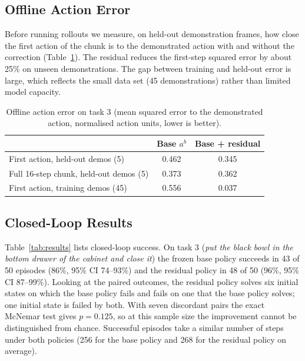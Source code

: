 \documentclass[conference]{IEEEtran}
\begin{document}
\subsection{Offline Action Error}
Before running rollouts we measure, on held-out demonstration frames, how close the first action of the chunk is to the demonstrated action with and without the correction (Table~\ref{tab:offline}). The residual reduces the first-step squared error by about 25\% on unseen demonstrations. The gap between training and held-out error is large, which reflects the small data set (45 demonstrations) rather than limited model capacity.

\begin{table}[t]
\centering
\caption{Offline action error on task 3 (mean squared error to the demonstrated action, normalised action units, lower is better).}
\label{tab:offline}
\begin{tabular}{lcc}
\toprule
 & Base $a^{b}$ & Base + residual \\
\midrule
First action, held-out demos (5) & 0.462 & 0.345 \\
Full 16-step chunk, held-out demos (5) & 0.373 & 0.362 \\
First action, training demos (45) & 0.556 & 0.037 \\
\bottomrule
\end{tabular}
\end{table}

\subsection{Closed-Loop Results}
Table~\ref{tab:results} lists closed-loop success. On task 3 (\emph{put the black bowl in the bottom drawer of the cabinet and close it}) the frozen base policy succeeds in 43 of 50 episodes (86\%, 95\% CI 74--93\%) and the residual policy in 48 of 50 (96\%, 95\% CI 87--99\%). Looking at the paired outcomes, the residual policy solves six initial states on which the base policy fails and fails on one that the base policy solves; one initial state is failed by both. With seven discordant pairs the exact McNemar test gives $p=0.125$, so at this sample size the improvement cannot be distinguished from chance. Successful episodes take a similar number of steps under both policies (256 for the base policy and 268 for the residual policy on average).
\end{document}
